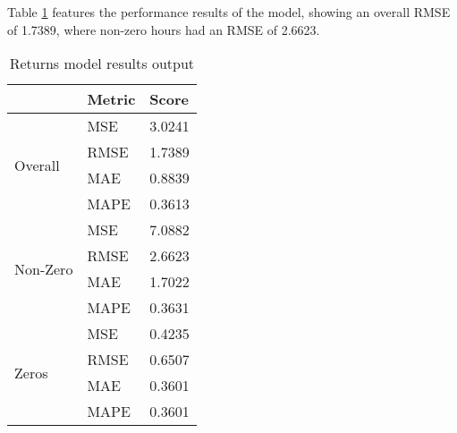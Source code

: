 \documentclass{article}
\begin{document}
Table \ref{t:returns} features the performance results of the model, showing an overall RMSE of 1.7389, where non-zero hours had an RMSE of 2.6623.

\begin{table}[]
\hspace*{+3cm}  
\begin{tabular}{||l|l|l||}
\hline
                          & Metric & Score  \\ \hline
\multirow{4}{*}{Overall}  & MSE    & 3.0241 \\ \cline{2-3} 
                          & RMSE   & 1.7389 \\ \cline{2-3} 
                          & MAE    & 0.8839 \\ \cline{2-3} 
                          & MAPE   & 0.3613 \\ \hline\hline
\multirow{4}{*}{Non-Zero} & MSE    & 7.0882 \\ \cline{2-3} 
                          & RMSE   & 2.6623 \\ \cline{2-3} 
                          & MAE    & 1.7022 \\ \cline{2-3} 
                          & MAPE   & 0.3631 \\ \hline\hline
\multirow{4}{*}{Zeros}    & MSE    & 0.4235 \\ \cline{2-3} 
                          & RMSE   & 0.6507 \\ \cline{2-3} 
                          & MAE    & 0.3601 \\ \cline{2-3} 
                          & MAPE   & 0.3601 \\ \hline

\end{tabular}
\caption{Returns model results output}
\label{t:returns}
\end{table}
\end{document}

